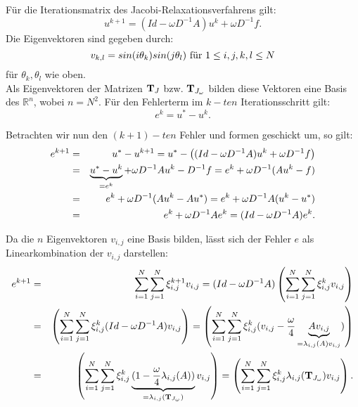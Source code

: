 Für die Iterationsmatrix des Jacobi-Relaxationsverfahrens gilt:
\begin{equation}
u^{k+1} = (Id - \omega D^{-1}A)u^{k} + \omega D^{-1}f.
\end{equation}
Die Eigenvektoren sind gegeben durch:
\begin{equation}
v_{k,l} = sin(i \theta_{k})sin(j \theta_{l}) \textnormal{ für } 1 \le i,j,k,l \le N
\end{equation}
für $\theta_{k}, \theta_{l}$ wie oben.\\
Als Eigenvektoren der Matrizen ${\textbf{T}}_{J}$ bzw. ${\textbf{T}}_{J_{\omega}}$ bilden diese Vektoren eine Basis des $\mathbb{R}^{n}$, wobei $n = N^{2}$.
Für den Fehlerterm im $k-ten$ Iterationsschritt gilt:
\begin{equation}
e^{k} = u^{*} - u^{k}.
\end{equation}

Betrachten wir nun den $(k+1)-ten$ Fehler und formen geschickt um, so gilt:
\begin{eqnarray}
e^{k+1} &=& u^{*} - u^{k+1} = u^{*} - \left( (Id - \omega D^{-1} A)u^{k} + \omega D^{-1}f \right) \notag \\
&=& \underbrace{u^{*} - u^{k}}_{= e^{k}} + \omega D^{-1} A u^{k} - D^{-1}f = e^{k} + \omega D^{-1} (Au^{k} - f) \notag \\
&=& e^{k} + \omega D^{-1} (Au^{k} - Au^{*}) = e^{k} + \omega D^{-1} A(u^{k} - u^{*}) \notag \\
&=& e^{k} + \omega D^{-1} A e^{k} = (Id - \omega D^{-1} A) e^{k}.
\end{eqnarray}

\label{img.Jacobi1}

Da die $n$ Eigenvektoren $v_{i,j}$ eine Basis bilden, lässt sich der Fehler $e$ als Linearkombination der $v_{i,j}$ darstellen:
\begin{eqnarray}
e^{k+1} &=& \sum_{i = 1}^{N} \sum_{j = 1}^{N} \xi^{k+1}_{i,j} v_{i,j} = (Id - \omega D^{-1}A) \left(\sum_{i = 1}^{N} \sum_{j = 1}^{N} \xi^{k}_{i,j} v_{i,j}\right) \notag \\
&=& \left(\sum_{i = 1}^{N} \sum_{j = 1}^{N} \xi^{k}_{i,j} (Id - \omega D^{-1}A) v_{i,j}\right) = \left(\sum_{i = 1}^{N} \sum_{j = 1}^{N} \xi^{k}_{i,j} (v_{i,j} - \frac {\omega} {4} \underbrace{A v_{i,j}}_{= \lambda_{i,j}(A)v_{i,j}})\right) \notag \\
&=& \left(\sum_{i = 1}^{N} \sum_{j = 1}^{N} \xi^{k}_{i,j} \underbrace{(1 - \frac {\omega} {4} \lambda_{i,j}(A))}_{= \lambda_{i,j}({\textbf{T}}_{J_{\omega}})} v_{i,j}\right) = \left(\sum_{i = 1}^{N} \sum_{j = 1}^{N} \xi^{k}_{i,j} \lambda_{i,j}({\textbf{T}}_{J_{\omega}}) v_{i,j}\right).
\end{eqnarray}


